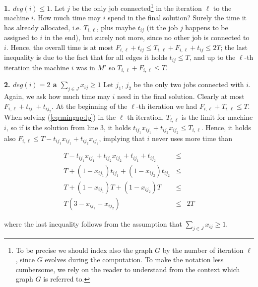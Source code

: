 \begin{dokaz}
  \noindent
  {\bfseries 1. $deg(i)\le1$}. Let $j$ be the only job connected\footnote{To be precise we should
    index also the graph $G$ by the number of iteration $\ell$, since $G$ evolves during the computation.
    To make the notation less cumbersome, we rely on the reader to understand from the context which graph $G$
  is referred to.} in the iteration $\ell$ to the machine $i$. How much time may $i$ spend in the final solution?
  Surely the time it has already allocated, i.e.  $T_{i,\ell}$, plus maybe $t_{ij}$ (it the job $j$ happens to
  be assigned to $i$ in the end), but surely not more, since no other job is connected to $i$. Hence, the
  overall time is at most  $F_{i,\ell}+t_{ij}\le T_{i,\ell}+F_{i,\ell}+t_{ij}\le 2T$;
  the last inequality is due to the fact that for all edges it holds  $t_{ij}\le T$, and up to the $\ell$-th
  iteration the machine $i$ was in $M'$ so $T_{i,\ell}+F_{i,\ell}\le T$.
    
  \noindent
  {\bfseries 2. $deg(i)=2$ a $\sum_{j\in J}x_{ij}\ge1$} Let $j_1$, $j_2$ 
  be the only two jobs connected with $i$. Again, we ask how much time may $i$ need in the final solution.
  Clearly at most $F_{i,\ell}+t_{ij_1}+t_{ij_2}$. At the beginning of the $\ell$-th iteration we had
  $F_{i,\ell}+T_{i,\ell}\le T$. When solving  (\ref{eq:mingap:lp}) in the $\ell$-th iteration, $T_{i,\ell}$
  is the limit for machine $i$, so if  is the solution from line 3, it holds
  $t_{ij_1}x_{ij_1}+t_{ij_2}x_{ij_2}\le T_{i,\ell}$. Hence, it holds also 
  $F_{i,\ell}\le T-t_{ij_1}x_{ij_1}+t_{ij_2}x_{ij_2}$, implying that $i$ never uses more time than
  
  \begin{eqnarray*}
    T-t_{ij_1}x_{ij_1}+t_{ij_2}x_{ij_2}+t_{ij_1}+t_{ij_2} &\le \\
    T + (1-x_{ij_1})t_{ij_1} + (1-x_{ij_2})t_{ij_2} &\le \\
    T + (1-x_{ij_1})T + (1-x_{ij_2})T &\le \\
    T (3-x_{ij_1}-x_{ij_2})&\le& 2T
  \end{eqnarray*}
  
  \noindent
  where the last inequality follows from the assumption that
  $\sum_{j\in J}x_{ij}\ge1$.

\end{dokaz}
